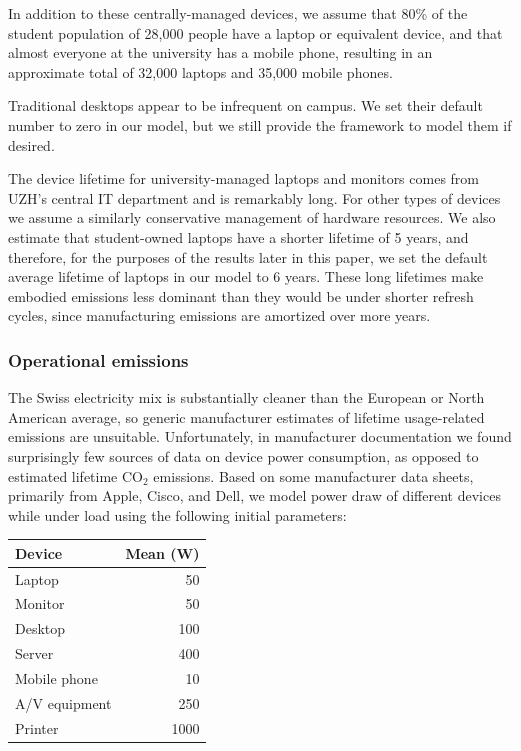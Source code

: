 \documentclass[11pt]{article}
\begin{document}
In addition to these centrally-managed devices, we assume that 80\% of the
student population of 28,000 people have a laptop or equivalent device, and that
almost everyone at the university has a mobile phone, resulting in an
approximate total of 32,000 laptops and 35,000 mobile phones.

Traditional desktops appear to be infrequent on campus. We set their default
number to zero in our model, but we still provide the framework to model them if
desired.

The device lifetime for university-managed laptops and monitors comes from UZH's
central IT department and is remarkably long. For other types of devices we
assume a similarly conservative management of hardware resources. We also
estimate that student-owned laptops have a shorter lifetime of 5 years, and
therefore, for the purposes of the results later in this paper, we set the
default average lifetime of laptops in our model to 6 years. These long
lifetimes make embodied emissions less dominant than they would be under shorter
refresh cycles, since manufacturing emissions are amortized over more years.

\subsubsection*{Operational emissions}

The Swiss electricity mix is substantially cleaner than the European or North
American average, so generic manufacturer estimates of lifetime usage-related
emissions are unsuitable. Unfortunately, in manufacturer documentation we found
surprisingly few sources of data on device power consumption, as opposed to
estimated lifetime CO$_2$ emissions. Based on some manufacturer data sheets,
primarily from Apple, Cisco, and Dell, we model power draw of different devices
while under load using the following initial parameters:

\begin{center}
  \begin{tabular}{|l|r|}
    \hline
    \textbf{Device} & \textbf{Mean (W)} \\ \hline
    Laptop & 50 \\ \hline
    Monitor & 50 \\ \hline
    Desktop & 100 \\ \hline
    Server & 400 \\ \hline
    Mobile phone & 10 \\ \hline
    A/V equipment & 250 \\ \hline
    Printer & 1000 \\ \hline
  \end{tabular}
\end{center}
\end{document}
